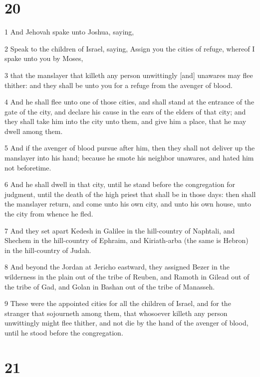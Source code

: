 \chapter{20}

\par 1 And Jehovah spake unto Joshua, saying,
\par 2 Speak to the children of Israel, saying, Assign you the cities of refuge, whereof I spake unto you by Moses,
\par 3 that the manslayer that killeth any person unwittingly [and] unawares may flee thither: and they shall be unto you for a refuge from the avenger of blood.
\par 4 And he shall flee unto one of those cities, and shall stand at the entrance of the gate of the city, and declare his cause in the ears of the elders of that city; and they shall take him into the city unto them, and give him a place, that he may dwell among them.
\par 5 And if the avenger of blood pursue after him, then they shall not deliver up the manslayer into his hand; because he smote his neighbor unawares, and hated him not beforetime.
\par 6 And he shall dwell in that city, until he stand before the congregation for judgment, until the death of the high priest that shall be in those days: then shall the manslayer return, and come unto his own city, and unto his own house, unto the city from whence he fled.
\par 7 And they set apart Kedesh in Galilee in the hill-country of Naphtali, and Shechem in the hill-country of Ephraim, and Kiriath-arba (the same is Hebron) in the hill-country of Judah.
\par 8 And beyond the Jordan at Jericho eastward, they assigned Bezer in the wilderness in the plain out of the tribe of Reuben, and Ramoth in Gilead out of the tribe of Gad, and Golan in Bashan out of the tribe of Manasseh.
\par 9 These were the appointed cities for all the children of Israel, and for the stranger that sojourneth among them, that whosoever killeth any person unwittingly might flee thither, and not die by the hand of the avenger of blood, until he stood before the congregation.

\chapter{21}


